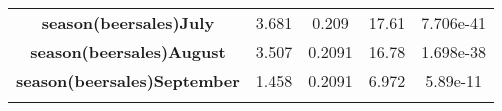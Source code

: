 \documentclass[]{book}
\theoremstyle{definition}
\theoremstyle{definition}
\theoremstyle{remark}
\begin{document}
\begin{longtable}[c]{@{}ccccc@{}}
\begin{minipage}[t]{0.37\columnwidth}\centering\strut
\textbf{season(beersales)July}
\strut\end{minipage} &
\begin{minipage}[t]{0.12\columnwidth}\centering\strut
3.681
\strut\end{minipage} &
\begin{minipage}[t]{0.14\columnwidth}\centering\strut
0.209
\strut\end{minipage} &
\begin{minipage}[t]{0.11\columnwidth}\centering\strut
17.61
\strut\end{minipage} &
\begin{minipage}[t]{0.11\columnwidth}\centering\strut
7.706e-41
\strut\end{minipage}\tabularnewline
\begin{minipage}[t]{0.37\columnwidth}\centering\strut
\textbf{season(beersales)August}
\strut\end{minipage} &
\begin{minipage}[t]{0.12\columnwidth}\centering\strut
3.507
\strut\end{minipage} &
\begin{minipage}[t]{0.14\columnwidth}\centering\strut
0.2091
\strut\end{minipage} &
\begin{minipage}[t]{0.11\columnwidth}\centering\strut
16.78
\strut\end{minipage} &
\begin{minipage}[t]{0.11\columnwidth}\centering\strut
1.698e-38
\strut\end{minipage}\tabularnewline
\begin{minipage}[t]{0.37\columnwidth}\centering\strut
\textbf{season(beersales)September}
\strut\end{minipage} &
\begin{minipage}[t]{0.12\columnwidth}\centering\strut
1.458
\strut\end{minipage} &
\begin{minipage}[t]{0.14\columnwidth}\centering\strut
0.2091
\strut\end{minipage} &
\begin{minipage}[t]{0.11\columnwidth}\centering\strut
6.972
\strut\end{minipage} &
\begin{minipage}[t]{0.11\columnwidth}\centering\strut
5.89e-11
\strut\end{minipage}\tabularnewline
\begin{minipage}[t]{0.37\columnwidth}\centering\strut

\end{minipage}
\end{longtable}
\end{document}
